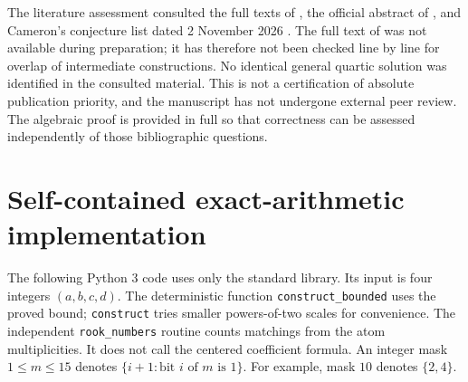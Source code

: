 \documentclass[11pt,a4paper]{article}
\theoremstyle{definition}
\begin{document}
The literature assessment consulted the full texts of
\cite{Bohn,CM,Gilmore,DM22}, the official abstract of \cite{DM19}, and
Cameron's conjecture list dated 2 November 2026 \cite{CameronWeb}.
The full text of \cite{DM19} was not available during preparation; it has
therefore not been checked line by line for overlap of intermediate
constructions. No identical general quartic solution was identified in
the consulted material. This is not a certification of absolute publication
priority, and the manuscript has not undergone external peer review.
The algebraic proof is provided in full so that correctness can be assessed
independently of those bibliographic questions.

\appendix
\section{Self-contained exact-arithmetic implementation}\label{app:code}

The following Python 3 code uses only the standard library. Its input
is four integers $(a,b,c,d)$. The deterministic function
\texttt{construct\_bounded} uses the proved bound; \texttt{construct}
tries smaller powers-of-two scales for convenience. The independent
\texttt{rook\_numbers} routine counts matchings from the atom multiplicities.
It does not call the centered coefficient formula. An integer mask
$1\le m\le15$ denotes $\{i+1: \text{bit }i\text{ of }m\text{ is }1\}$.
For example, mask $10$ denotes $\{2,4\}$.
\end{document}
